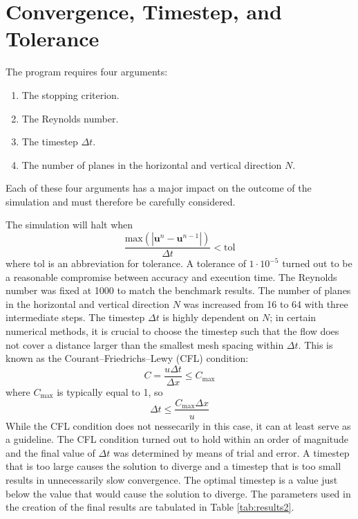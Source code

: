 \section{Convergence, Timestep, and Tolerance}

The program requires four arguments:
\begin{enumerate}
    \item The stopping criterion.
    \item The Reynolds number.
    \item The timestep $\Delta t$.
    \item The number of planes in the horizontal and vertical direction $N$.
\end{enumerate}
Each of these four arguments has a major impact on the outcome of the simulation and must therefore be carefully considered. 

The simulation will halt when
\begin{equation}
    \frac{ \text{max} \left( \left| \mathbf{u}^n - \mathbf{u}^{n-1} \right| \right) }{\Delta t} < \text{tol}
\end{equation}
where tol is an abbreviation for tolerance. A tolerance of $1 \cdot 10^{-5}$ turned out to be a reasonable compromise between accuracy and execution time. The Reynolds number was fixed at 1000 to match the benchmark results. The number of planes in the horizontal and vertical direction $N$ was increased from 16 to 64 with three intermediate steps. The timestep $\Delta t$ is highly dependent on $N$; in certain numerical methods, it is crucial to choose the timestep such that the flow does not cover a distance larger than the smallest mesh spacing within $\Delta t$. This is known as the Courant–Friedrichs–Lewy (CFL) condition:
\begin{equation}
    C = \frac{u \Delta t}{\Delta x} \leq C_{\text{max}}
\end{equation}
where $C_{\text{max}}$ is typically equal to 1, so
\begin{equation}
    \Delta t \leq \frac{C_{\text{max}} \Delta x}{u}
\end{equation}
While the CFL condition does not nessecarily in this case, it can at least serve as a guideline. The CFL condition turned out to hold within an order of magnitude and the final value of $\Delta t$ was determined by means of trial and error. A timestep that is too large causes the solution to diverge and a timestep that is too small results in unnecessarily slow convergence. The optimal timestep is a value just below the value that would cause the solution to diverge. The parameters used in the creation of the final results are tabulated in Table \ref{tab:results2}.

